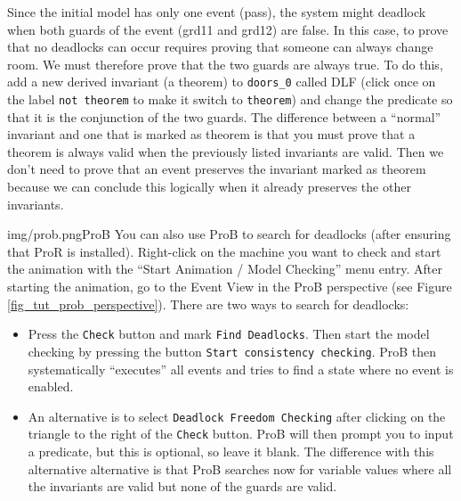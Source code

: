 Since the initial model has only one event (\textsf{pass}), the system might deadlock when both guards of the event (\textsf{grd11} and \textsf{grd12}) are false.
In this case, to prove that no deadlocks can occur requires proving that someone can always change room. We must therefore prove that the two guards are always true. 
To do this, add a new derived invariant (a theorem) to \texttt{doors\_0} called \textsf{DLF} (click once on the label \texttt{not theorem} to make it switch to \texttt{theorem})
  and change the predicate so that it is the conjunction of the two guards.
The difference between a ``normal'' invariant and one that is marked as theorem is that you must prove that a theorem is always valid when the previously listed invariants are valid. Then we don't need to prove that an event preserves the invariant marked as theorem because we can conclude this logically when it already preserves the other invariants.

\begin{description}
\INVARIANTS
	\begin{description}
	\end{description}
\end{description}


\begin{rodin-plugin}{img/prob.png}{ProB}%
  You can also use ProB to search for deadlocks (after ensuring that ProR is installed).
  Right-click on the machine you want to check and start the animation with the
  ``Start Animation / Model Checking'' menu entry.
  After starting the animation, go to the Event View in the ProB perspective
  (see Figure \ref{fig_tut_prob_perspective}).
  There are two ways to search for deadlocks:
  \begin{itemize}
  \item Press the \texttt{Check} button and mark \texttt{Find Deadlocks}. Then start the model checking by pressing the button \texttt{Start consistency checking}.
    ProB then systematically ``executes'' all events and tries to find a state where no
    event is enabled.
  \item An alternative is to select \texttt{Deadlock Freedom Checking} after clicking
    on the triangle to the right of the \texttt{Check} button.
    ProB will then prompt you to input a predicate, but this is optional, so leave it blank. The difference with this alternative alternative is that ProB searches now for variable values
    where all the invariants are valid but none of the guards are valid.
  \end{itemize}
\end{rodin-plugin}

